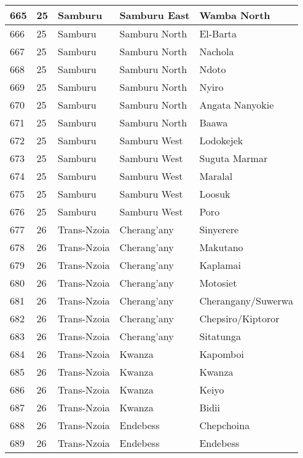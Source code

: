 \begin{table}[!ht]
\begin{tabular}{|l|l|l|l|l|}
        665 & 25 & Samburu & Samburu East & Wamba North \\ \hline
        666 & 25 & Samburu & Samburu North & El-Barta \\ \hline
        667 & 25 & Samburu & Samburu North & Nachola \\ \hline
        668 & 25 & Samburu & Samburu North & Ndoto \\ \hline
        669 & 25 & Samburu & Samburu North & Nyiro \\ \hline
        670 & 25 & Samburu & Samburu North & Angata Nanyokie \\ \hline
        671 & 25 & Samburu & Samburu North & Baawa \\ \hline
        672 & 25 & Samburu & Samburu West & Lodokejek \\ \hline
        673 & 25 & Samburu & Samburu West & Suguta Marmar \\ \hline
        674 & 25 & Samburu & Samburu West & Maralal \\ \hline
        675 & 25 & Samburu & Samburu West & Loosuk \\ \hline
        676 & 25 & Samburu & Samburu West & Poro \\ \hline
        677 & 26 & Trans-Nzoia & Cherang’any & Sinyerere \\ \hline
        678 & 26 & Trans-Nzoia & Cherang’any & Makutano \\ \hline
        679 & 26 & Trans-Nzoia & Cherang’any & Kaplamai \\ \hline
        680 & 26 & Trans-Nzoia & Cherang’any & Motosiet \\ \hline
        681 & 26 & Trans-Nzoia & Cherang’any & Cherangany/Suwerwa \\ \hline
        682 & 26 & Trans-Nzoia & Cherang’any & Chepsiro/Kiptoror \\ \hline
        683 & 26 & Trans-Nzoia & Cherang’any & Sitatunga \\ \hline
        684 & 26 & Trans-Nzoia & Kwanza & Kapomboi \\ \hline
        685 & 26 & Trans-Nzoia & Kwanza & Kwanza \\ \hline
        686 & 26 & Trans-Nzoia & Kwanza & Keiyo \\ \hline
        687 & 26 & Trans-Nzoia & Kwanza & Bidii \\ \hline
        688 & 26 & Trans-Nzoia & Endebess & Chepchoina \\ \hline
        689 & 26 & Trans-Nzoia & Endebess & Endebess \\ \hline

\end{tabular}
\end{table}
